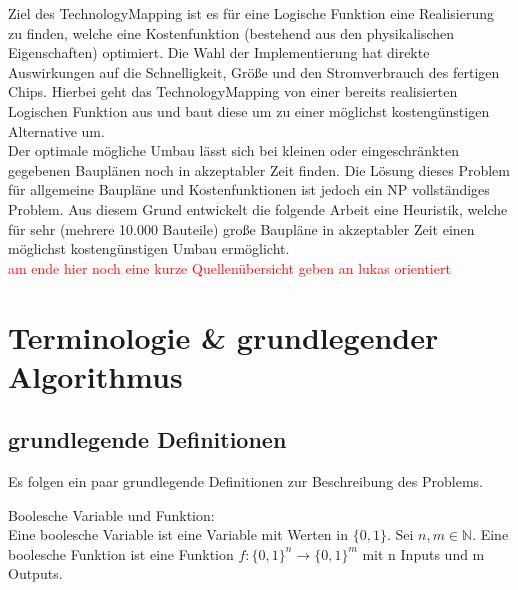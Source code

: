 \documentclass[11pt, a4paper, german]{article}
\newcommand{\TM}{TechnologyMapping }
\begin{document}
Ziel des \TM ist es für eine Logische Funktion eine Realisierung zu finden, welche eine Kostenfunktion (bestehend aus den physikalischen Eigenschaften) optimiert. Die Wahl der Implementierung hat direkte Auswirkungen auf die  Schnelligkeit, Größe und den Stromverbrauch des fertigen Chips. Hierbei geht das \TM von einer bereits realisierten Logischen Funktion aus und baut diese um zu einer möglichst kostengünstigen Alternative um. \\
Der optimale mögliche Umbau lässt sich bei kleinen oder eingeschränkten gegebenen Bauplänen noch in akzeptabler Zeit finden. Die Lösung dieses Problem für allgemeine Baupläne und Kostenfunktionen ist jedoch ein NP vollständiges Problem. Aus diesem Grund entwickelt die folgende Arbeit eine Heuristik, welche für sehr (mehrere 10.000 Bauteile) große Baupläne in akzeptabler Zeit einen möglichst kostengünstigen Umbau ermöglicht.\\
\textcolor{red}{am ende hier noch eine kurze Quellenübersicht geben an lukas orientiert}

\newpage

\section{Terminologie \& grundlegender Algorithmus}
\label{sec:terminologie&grundl}
\subsection{grundlegende Definitionen}
\label{subsec:grundlegende_definitionen}
Es folgen ein paar grundlegende Definitionen zur Beschreibung des Problems.

\begin{definition}{Boolesche Variable und Funktion: } \\
Eine boolesche Variable ist eine Variable mit Werten in $ \{ 0 , 1 \} $.
Sei $ n, m \in \mathbb{N}$. Eine boolesche Funktion ist eine Funktion $ f : \{ 0 , 1 \}^n \rightarrow \{ 0 , 1 \}^m $ mit n Inputs und m Outputs. 
\end{definition}
\end{document}
